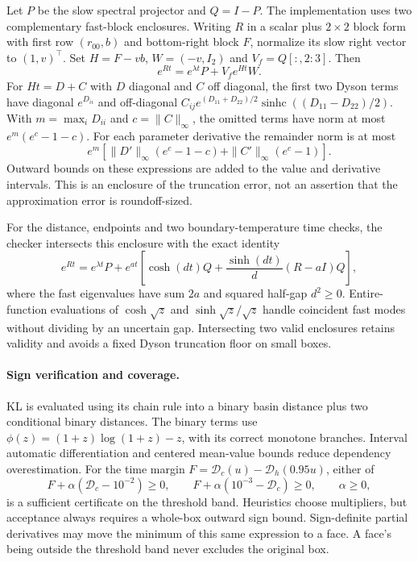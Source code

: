 Let $P$ be the slow spectral projector and $Q=I-P$.
The implementation uses two complementary fast-block enclosures.
Writing $R$ in a scalar plus $2\times2$ block form with first row
$(r_{00},b)$ and bottom-right block $F$, normalize its slow right
vector to $(1,v)^\top$. Set $H=F-vb$, $W=(-v,I_2)$ and
$V_f=Q[:,2:3]$. Then
\[
 e^{Rt}=e^{\lambda t}P+V_f e^{Ht}W.
\]
For $Ht=D+C$ with $D$ diagonal and $C$ off diagonal, the first two
Dyson terms have diagonal $e^{D_{ii}}$ and off-diagonal
$C_{ij}e^{(D_{11}+D_{22})/2}\operatorname{sinhc}((D_{11}-D_{22})/2)$.
With $m=\max_iD_{ii}$ and $c=\|C\|_\infty$, the omitted terms have norm
at most $e^m(e^c-1-c)$. For each parameter derivative the remainder norm
is at most
\[
 e^m\left[\|D'\|_\infty(e^c-1-c)
               +\|C'\|_\infty(e^c-1)\right].
\]
Outward bounds on these expressions are added to the value and derivative
intervals. This is an enclosure of the truncation error, not an assertion
that the approximation error is roundoff-sized.

For the distance, endpoints and two boundary-temperature time checks,
the checker intersects this enclosure with the exact identity
\[
 e^{Rt}=e^{\lambda t}P+
 e^{at}\left[\cosh(dt)Q+\frac{\sinh(dt)}{d}(R-aI)Q\right],
\]
where the fast eigenvalues have sum $2a$ and squared half-gap $d^2\geq0$.
Entire-function evaluations of $\cosh\sqrt z$ and
$\sinh\sqrt z/\sqrt z$ handle coincident fast modes without dividing by
an uncertain gap. Intersecting two valid enclosures retains validity and
avoids a fixed Dyson truncation floor on small boxes.

\paragraph{Sign verification and coverage.}
KL is evaluated using its chain rule into a binary basin distance plus
two conditional binary distances. The binary terms use
$\phi(z)=(1+z)\log(1+z)-z$, with its correct monotone branches.
Interval automatic differentiation and centered mean-value bounds reduce
dependency overestimation. For the time margin
$F=\mathcal D_c(u)-\mathcal D_h(0.95u)$, either of
\[
 F+\alpha(\mathcal D_c-10^{-2})\geq0,
 \qquad F+\alpha(10^{-3}-\mathcal D_c)\geq0,
 \qquad\alpha\geq0,
\]
is a sufficient certificate on the threshold band. Heuristics choose
multipliers, but acceptance always requires a whole-box outward sign
bound. Sign-definite partial derivatives may move the minimum of this
same expression to a face. A face's being outside the threshold band
never excludes the original box.

